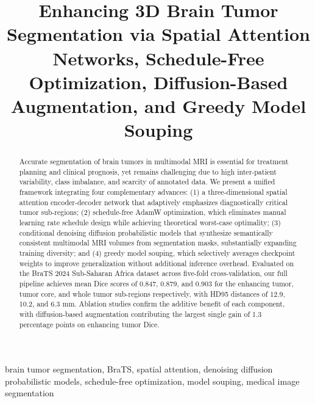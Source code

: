 \documentclass[conference]{IEEEtran}
\begin{document}
\title{Enhancing 3D Brain Tumor Segmentation via Spatial Attention
Networks, Schedule-Free Optimization, Diffusion-Based Augmentation,
and Greedy Model Souping}

\author{
}

\maketitle

\begin{abstract}
Accurate segmentation of brain tumors in multimodal MRI is
essential for treatment planning and clinical prognosis, yet remains
challenging due to high inter-patient variability, class imbalance,
and scarcity of annotated data. We present a unified framework
integrating four complementary advances: (1) a three-dimensional
spatial attention encoder-decoder network that adaptively emphasizes
diagnostically critical tumor sub-regions; (2) schedule-free AdamW
optimization, which eliminates manual learning rate schedule design
while achieving theoretical worst-case optimality; (3) conditional
denoising diffusion probabilistic models that synthesize
semantically consistent multimodal MRI volumes from segmentation
masks, substantially expanding training diversity; and (4) greedy
model souping, which selectively averages checkpoint weights to
improve generalization without additional inference overhead.
Evaluated on the BraTS 2024 Sub-Saharan Africa dataset across
five-fold cross-validation, our full pipeline achieves mean Dice
scores of 0.847, 0.879, and 0.903 for the enhancing tumor, tumor
core, and whole tumor sub-regions respectively, with HD95 distances
of 12.9, 10.2, and 6.3 mm. Ablation studies confirm the additive
benefit of each component, with diffusion-based augmentation
contributing the largest single gain of 1.3 percentage points on
enhancing tumor Dice.
\end{abstract}

\begin{IEEEkeywords}
brain tumor segmentation, BraTS, spatial attention, denoising
diffusion probabilistic models, schedule-free optimization,
model souping, medical image segmentation
\end{IEEEkeywords}
\end{document}
